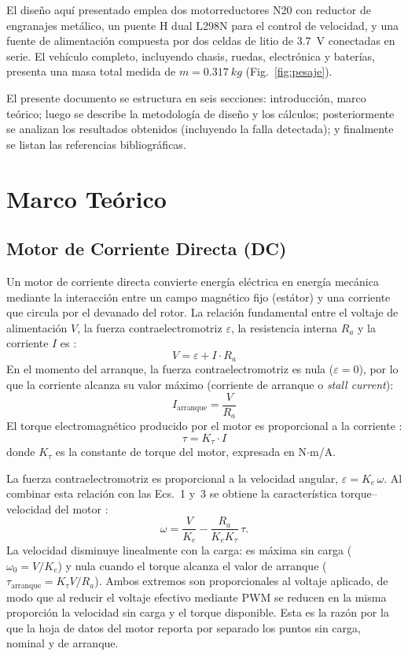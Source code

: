 \documentclass[conference]{IEEEtran}
\newcommand{\valMassKg}{0.317}
\begin{document}
El diseño aquí presentado emplea dos motorreductores N20 con reductor de engranajes metálico, un puente H dual L298N para el control de velocidad, y una fuente de alimentación compuesta por dos celdas de litio de \SI{3.7}{V} conectadas en serie. El vehículo completo, incluyendo chasis, ruedas, electrónica y baterías, presenta una masa total medida de $m = \SI{\valMassKg}{kg}$ (Fig.~\ref{fig:pesaje}).

El presente documento se estructura en seis secciones: introducción, marco teórico; luego se describe la metodología de diseño y los cálculos; posteriormente se analizan los resultados obtenidos (incluyendo la falla detectada); y finalmente se listan las referencias bibliográficas.

\section{Marco Teórico}
\subsection{Motor de Corriente Directa (DC)}
Un motor de corriente directa convierte energía eléctrica en energía mecánica mediante la interacción entre un campo magnético fijo (estátor) y una corriente que circula por el devanado del rotor. La relación fundamental entre el voltaje de alimentación $V$, la fuerza contraelectromotriz $\varepsilon$, la resistencia interna $R_a$ y la corriente $I$ es \cite{chapman}:
\begin{equation}
V = \varepsilon + I \cdot R_a
\end{equation}
En el momento del arranque, la fuerza contraelectromotriz es nula ($\varepsilon = 0$), por lo que la corriente alcanza su valor máximo (corriente de arranque o \emph{stall current}):
\begin{equation}
I_{\text{arranque}} = \frac{V}{R_a}
\end{equation}
El torque electromagnético producido por el motor es proporcional a la corriente \cite{chapman}:
\begin{equation}
\tau = K_\tau \cdot I
\end{equation}
donde $K_\tau$ es la constante de torque del motor, expresada en N$\cdot$m/A.

La fuerza contraelectromotriz es proporcional a la velocidad angular, $\varepsilon = K_e\,\omega$. Al combinar esta relación con las Ecs.~1 y~3 se obtiene la característica torque--velocidad del motor \cite{chapman}:
\[
\omega = \frac{V}{K_e} - \frac{R_a}{K_e K_\tau}\,\tau .
\]
La velocidad disminuye linealmente con la carga: es máxima sin carga ($\omega_0 = V/K_e$) y nula cuando el torque alcanza el valor de arranque ($\tau_{\text{arranque}} = K_\tau V/R_a$). Ambos extremos son proporcionales al voltaje aplicado, de modo que al reducir el voltaje efectivo mediante PWM se reducen en la misma proporción la velocidad sin carga y el torque disponible. Esta es la razón por la que la hoja de datos del motor reporta por separado los puntos sin carga, nominal y de arranque.
\end{document}
